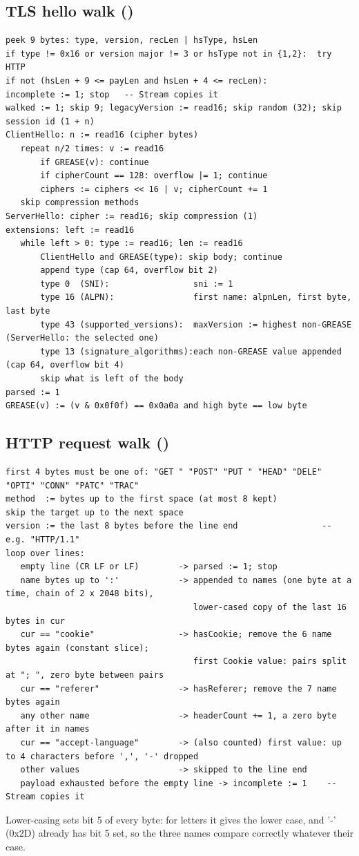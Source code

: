 \subsection{TLS hello walk ()}
\begin{Verbatim}
peek 9 bytes: type, version, recLen | hsType, hsLen
if type != 0x16 or version major != 3 or hsType not in {1,2}:  try HTTP
if not (hsLen + 9 <= payLen and hsLen + 4 <= recLen):          incomplete := 1; stop   -- Stream copies it
walked := 1; skip 9; legacyVersion := read16; skip random (32); skip session id (1 + n)
ClientHello: n := read16 (cipher bytes)
   repeat n/2 times: v := read16
       if GREASE(v): continue
       if cipherCount == 128: overflow |= 1; continue
       ciphers := ciphers << 16 | v; cipherCount += 1
   skip compression methods
ServerHello: cipher := read16; skip compression (1)
extensions: left := read16
   while left > 0: type := read16; len := read16
       ClientHello and GREASE(type): skip body; continue
       append type (cap 64, overflow bit 2)
       type 0  (SNI):                 sni := 1
       type 16 (ALPN):                first name: alpnLen, first byte, last byte
       type 43 (supported_versions):  maxVersion := highest non-GREASE (ServerHello: the selected one)
       type 13 (signature_algorithms):each non-GREASE value appended (cap 64, overflow bit 4)
       skip what is left of the body
parsed := 1
GREASE(v) := (v & 0x0f0f) == 0x0a0a and high byte == low byte
\end{Verbatim}

\subsection{HTTP request walk ()}
\begin{Verbatim}
first 4 bytes must be one of: "GET " "POST" "PUT " "HEAD" "DELE" "OPTI" "CONN" "PATC" "TRAC"
method  := bytes up to the first space (at most 8 kept)
skip the target up to the next space
version := the last 8 bytes before the line end                 -- e.g. "HTTP/1.1"
loop over lines:
   empty line (CR LF or LF)        -> parsed := 1; stop
   name bytes up to ':'            -> appended to names (one byte at a time, chain of 2 x 2048 bits),
                                      lower-cased copy of the last 16 bytes in cur
   cur == "cookie"                 -> hasCookie; remove the 6 name bytes again (constant slice);
                                      first Cookie value: pairs split at "; ", zero byte between pairs
   cur == "referer"                -> hasReferer; remove the 7 name bytes again
   any other name                  -> headerCount += 1, a zero byte after it in names
   cur == "accept-language"        -> (also counted) first value: up to 4 characters before ',', '-' dropped
   other values                    -> skipped to the line end
   payload exhausted before the empty line -> incomplete := 1    -- Stream copies it
\end{Verbatim}
Lower-casing sets bit 5 of every byte: for letters it gives the lower case, and '-' (0x2D) already has bit 5 set, so
the three names compare correctly whatever their case.

